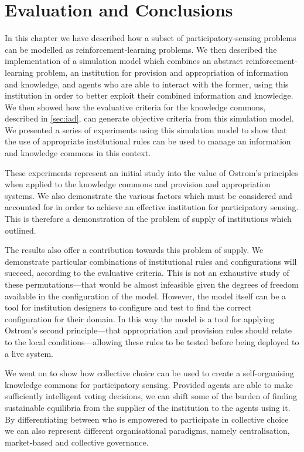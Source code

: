 \section{Evaluation and Conclusions}

In this chapter we have described how a subset of participatory-sensing
problems can be modelled as reinforcement-learning problems. We then described
the implementation of a simulation model which combines an abstract
reinf\-orcement-learning problem, an institution for provision and appropriation
of information and knowledge, and agents who are able to interact with the
former, using this institution in order to better exploit their combined
information and knowledge. We then showed how the evaluative criteria for the
knowledge commons, described in \autoref{sec:iad}, can generate objective
criteria from this simulation model. We presented a series of experiments
using this simulation model to show that the use of appropriate institutional
rules can be used to manage an information and knowledge commons in this
context.

These experiments represent an initial study into the value of Ostrom's
principles when applied to the knowledge commons and provision and
appropriation systems. We also demonstrate the various factors which must be
considered and accounted for in order to achieve an effective institution for
participatory sensing. This is therefore a demonstration of the problem of
supply of institutions which \citet{Ostrom1990} outlined.

The results also offer a contribution towards this problem of supply. We
demonstrate particular combinations of institutional rules and configurations
will succeed, according to the evaluative criteria. This is not an exhaustive
study of these permutations---that would be almost infeasible given the degrees of
freedom available in the configuration of the model. However, the model itself
can be a tool for institution designers to configure and test to find the
correct configuration for their domain. In this way the model is a tool for
applying Ostrom's second principle---that appropriation and provision rules
should relate to the local conditions---allowing these rules to be tested
before being deployed to a live system.

We went on to show how collective choice can be used to create a 
self-organising knowledge commons for participatory sensing. Provided agents are
able to make sufficiently intelligent voting decisions, we can shift some of
the burden of finding sustainable equilibria from the supplier of the
institution to the agents using it. By differentiating between who is
empowered to participate in collective choice we can also represent different
organisational paradigms, namely centralisation, market-based and collective
governance.


